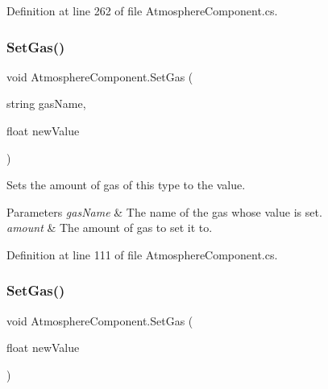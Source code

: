 Definition at line 262 of file Atmosphere\+Component.\+cs.

\mbox{\label{class_atmosphere_component_a0dd1d74b73b45aac38e77297532a50f3}} 
\subsubsection{\texorpdfstring{Set\+Gas()}{SetGas()}\hspace{0.1cm}{\footnotesize\ttfamily [1/2]}}
{\footnotesize\ttfamily void Atmosphere\+Component.\+Set\+Gas (\begin{DoxyParamCaption}\item[{string}]{gas\+Name,  }\item[{float}]{new\+Value }\end{DoxyParamCaption})}



Sets the amount of gas of this type to the value. 


\begin{DoxyParams}{Parameters}
{\em gas\+Name} & The name of the gas whose value is set.\\
\hline
{\em amount} & The amount of gas to set it to.\\
\hline
\end{DoxyParams}


Definition at line 111 of file Atmosphere\+Component.\+cs.

\mbox{\label{class_atmosphere_component_a84ad0d10ca2c978df17736750cb4ac61}} 
\subsubsection{\texorpdfstring{Set\+Gas()}{SetGas()}\hspace{0.1cm}{\footnotesize\ttfamily [2/2]}}
{\footnotesize\ttfamily void Atmosphere\+Component.\+Set\+Gas (\begin{DoxyParamCaption}\item[{float}]{new\+Value }\end{DoxyParamCaption})}



